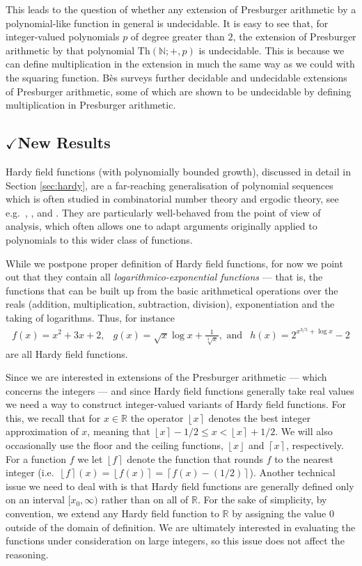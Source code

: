 \documentclass{amsart}
\theoremstyle{definition}
\newcommand{\nint}[1]{\left\lfloor #1 \right\rceil}
\newcommand{\floor}[1]{\left\lfloor #1 \right\rfloor}
\newcommand{\ceil}[1]{\left\lceil #1 \right\rceil}
\newcommand{\NN}{\mathbb{N}}
\newcommand{\RR}{\mathbb{R}}
\newcommand{\theory}[1]{\mathrm{Th}(#1)}
\begin{document}
This leads to the question of whether any extension of Presburger arithmetic by a polynomial-like function in general is undecidable. It is easy to see that, for integer-valued polynomials $p$ of degree greater than $2$, the extension of Presburger arithmetic by that polynomial $\theory{\NN; +, p}$ is undecidable. This is because we can define multiplication in the extension in much the same way as we could with the squaring function. B\`es \cite{Bes-2001} surveys further decidable and undecidable extensions of Presburger arithmetic, some of which are shown to be undecidable by defining multiplication in Presburger arithmetic.

\subsection{$\checkmark$New Results}
\label{sec:new-results}
Hardy field functions (with polynomially bounded growth), discussed in detail in Section \ref{sec:hardy}, are a far-reaching generalisation of polynomial sequences which is often studied in combinatorial number theory and ergodic theory, see e.g.\ \cite{Boshernitzan-1981}, \cite{Boshernitzan-1994}, \cite{Frantzikinakis-2009} and \cite{Richter-2022}. They are particularly well-behaved from the point of view of analysis, which often allows one to adapt arguments originally applied to polynomials to this wider class of functions. 

While we postpone proper definition of Hardy field functions, for now we point out that they contain all \emph{logarithmico-exponential functions} --- that is, the functions that can be built up from the basic arithmetical operations over the reals (addition, multiplication, subtraction, division), exponentiation and the taking of logarithms. Thus, for instance
\begin{eqnarray*}
f(x) = x^2 + 3x + 2,&g(x) = \sqrt{x}\log x + \frac{1}{\sqrt[3]{x}}, \text{ and}&h(x) = 2^{x^{3/5} + \log x} - 2
\end{eqnarray*}
are all Hardy field functions.

Since we are interested in extensions of the Presburger arithmetic --- which concerns the integers --- and since Hardy field functions generally take real values we need a way to construct integer-valued variants of Hardy field functions. For this, we recall that for $x \in \RR$ the operator $\nint{x}$ denotes the best integer approximation of $x$, meaning that $\nint{x}-1/2 \leq x < \nint{x}+1/2$. We will also occasionally use the floor and the ceiling functions, $\floor{x}$ and $\ceil{x}$, respectively. For a function $f$ we let $\nint{f}$ denote the function that rounds $f$ to the nearest integer (i.e.\ $\nint{f}(x) = \nint{f(x)} = \ceil{f(x)-(1/2)}$). Another technical issue we need to deal with is that Hardy field functions are generally defined only on an interval $[x_0,\infty)$ rather than on all of $\RR$. For the sake of simplicity, by convention, we extend any Hardy field function to $\RR$ by assigning the value $0$ outside of the domain of definition. We are ultimately interested in evaluating the functions under consideration on large integers, so this issue does not affect the reasoning.
\end{document}
